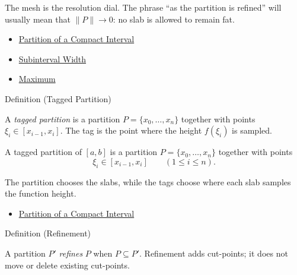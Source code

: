 \begin{remark*}[Interpretation]
The mesh is the resolution dial. The phrase ``as the partition is refined''
will usually mean that \(\|P\|\to 0\): no slab is allowed to remain fat.
\end{remark*}

\begin{dependencies}
\begin{itemize}
  \item \hyperref[def:integration-partition]{Partition of a Compact Interval}
  \item \hyperref[def:subinterval-width-integration]{Subinterval Width}
  \item \hyperref[def:maximum]{Maximum}
\end{itemize}
\end{dependencies}

\begin{definitionbox}{Definition (Tagged Partition)}
\begin{definition}
\label{def:tagged-partition-integration}
A \emph{tagged partition} is a partition \(P=\{x_0,\ldots,x_n\}\) together
with points \(\xi_i\in[x_{i-1},x_i]\). The tag is the point where the height
\(f(\xi_i)\) is sampled.
\end{definition}
\end{definitionbox}

\begin{remark*}
A tagged partition of \([a,b]\) is a partition
\(P=\{x_0,\ldots,x_n\}\) together with points
\[
  \xi_i\in[x_{i-1},x_i]\qquad(1\le i\le n).
\]
\end{remark*}

\begin{remark*}[Interpretation]
The partition chooses the slabs, while the tags choose where each slab samples
the function height.
\end{remark*}

\begin{dependencies}
\begin{itemize}
  \item \hyperref[def:integration-partition]{Partition of a Compact Interval}
\end{itemize}
\end{dependencies}

\begin{definitionbox}{Definition (Refinement)}
\begin{definition}
\label{def:partition-refinement}
A partition \(P'\) \emph{refines} \(P\) when \(P\subseteq P'\). Refinement adds
cut-points; it does not move or delete existing cut-points.
\end{definition}
\end{definitionbox}

